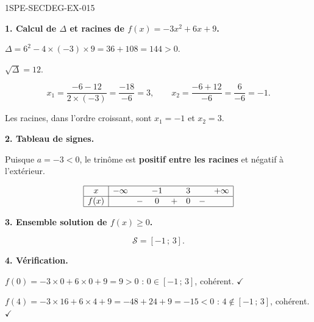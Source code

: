 \begin{corrige}{1SPE-SECDEG-EX-015}

\textbf{1. Calcul de $\Delta$ et racines de $f(x) = -3x^2 + 6x + 9$.}


$\Delta = 6^2 - 4 \times (-3) \times 9 = 36 + 108 = 144 > 0$.

$\sqrt{\Delta} = 12$.

\[x_1 = \frac{-6 - 12}{2 \times (-3)} = \frac{-18}{-6} = 3, \qquad x_2 = \frac{-6 + 12}{-6} = \frac{6}{-6} = -1.\]

Les racines, dans l'ordre croissant, sont $x_1 = -1$ et $x_2 = 3$.

\medskip
\textbf{2. Tableau de signes.}


Puisque $a = -3 < 0$, le trinôme est \textbf{positif entre les racines} et négatif à l'extérieur.

\[
\begin{array}{|c|ccccccc|}
\hline
x & -\infty & & -1 & & 3 & & +\infty \\
\hline
f(x) & & - & 0 & + & 0 & - & \\
\hline
\end{array}
\]

\medskip
\textbf{3. Ensemble solution de $f(x) \geqslant 0$.}

\[\boxed{\mathcal{S} = \left[-1\,;\,3\right].}\]

\medskip
\textbf{4. Vérification.}

$f(0) = -3 \times 0 + 6 \times 0 + 9 = 9 > 0$ : $0 \in [-1\,;\,3]$, cohérent. \hfill $\checkmark$

$f(4) = -3 \times 16 + 6 \times 4 + 9 = -48 + 24 + 9 = -15 < 0$ : $4 \notin [-1\,;\,3]$, cohérent. \hfill $\checkmark$

\end{corrige}
